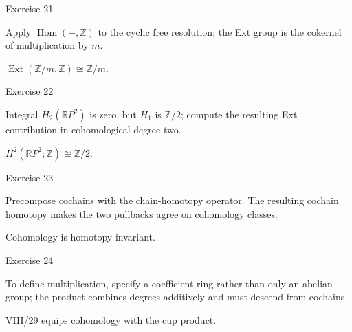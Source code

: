 \begin{exercise}\label{exr:viii28-21}
Exercise 21
\end{exercise}
\begin{hint}
Apply \(\operatorname{Hom}(-,\mathbb Z)\) to the cyclic free resolution; the Ext group is the cokernel of multiplication by \(m\).
\end{hint}
\begin{solution}
\(\operatorname{Ext}(\mathbb Z/m,\mathbb Z)\cong\mathbb Z/m\).
\end{solution}

\begin{exercise}\label{exr:viii28-22}
Exercise 22
\end{exercise}
\begin{hint}
Integral \(H_2(\mathbb RP^2)\) is zero, but \(H_1\) is \(\mathbb Z/2\); compute the resulting Ext contribution in cohomological degree two.
\end{hint}
\begin{solution}
\(H^2(\mathbb RP^2;\mathbb Z)\cong\mathbb Z/2\).
\end{solution}

\begin{exercise}\label{exr:viii28-23}
Exercise 23
\end{exercise}
\begin{hint}
Precompose cochains with the chain-homotopy operator. The resulting cochain homotopy makes the two pullbacks agree on cohomology classes.
\end{hint}
\begin{solution}
Cohomology is homotopy invariant.
\end{solution}

\begin{exercise}\label{exr:viii28-24}
Exercise 24
\end{exercise}
\begin{hint}
To define multiplication, specify a coefficient ring rather than only an abelian group; the product combines degrees additively and must descend from cochains.
\end{hint}
\begin{solution}
VIII/29 equips cohomology with the cup product.
\end{solution}


